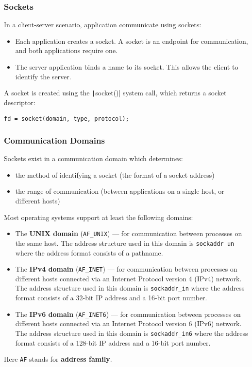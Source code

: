 \documentclass{article}
\begin{document}
\subsubsection{Sockets}
In a client-server scenario, application communicate using sockets:
\begin{itemize}
    \item Each application creates a socket. A socket is an endpoint
          for communication, and both applications require one.
    \item The server application binds a name to its socket. This
          allows the client to identify the server.
\end{itemize}
A socket is created using the \texttt|socket()| system call,
which returns a socket descriptor:
\begin{verbatim}
fd = socket(domain, type, protocol);
\end{verbatim}
\subsubsection{Communication Domains}
Sockets exist in a communication domain which determines:
\begin{itemize}
    \item the method of identifying a socket (the format of a socket
          address)
    \item the range of communication (between applications on a single
          host, or different hosts)
\end{itemize}
Most operating systems support at least the following domains:
\begin{itemize}
    \item The \textbf{UNIX domain} (\texttt{AF_UNIX}) --- for
          communication between processes on the same host. The address
          structure used in this domain is \texttt{sockaddr_un}
          where the address format consists of a pathname.
    \item The \textbf{IPv4 domain} (\texttt{AF_INET}) --- for
          communication between processes on different hosts connected
          via an Internet Protocol version 4 (IPv4) network. The
          address structure used in this domain is
          \texttt{sockaddr_in} where the address format consists
          of a 32-bit IP address and a 16-bit port number.
    \item The \textbf{IPv6 domain} (\texttt{AF_INET6}) --- for
          communication between processes on different hosts connected
          via an Internet Protocol version 6 (IPv6) network. The
          address structure used in this domain is
          \texttt{sockaddr_in6} where the address format
          consists of a 128-bit IP address and a 16-bit port number.
\end{itemize}
Here \texttt{AF} stands for \textbf{address family}.
\end{document}
